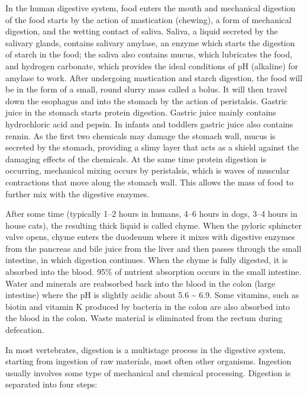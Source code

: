 In the human digestive system, food enters the mouth and mechanical digestion of the food starts by the action of mastication (chewing), a form of mechanical digestion, and the wetting contact of saliva. Saliva, a liquid secreted by the salivary glands, contains salivary amylase, an enzyme which starts the digestion of starch in the food; the saliva also contains mucus, which lubricates the food, and hydrogen carbonate, which provides the ideal conditions of pH (alkaline) for amylase to work. After undergoing mastication and starch digestion, the food will be in the form of a small, round slurry mass called a bolus. It will then travel down the esophagus and into the stomach by the action of peristalsis. Gastric juice in the stomach starts protein digestion. Gastric juice mainly contains hydrochloric acid and pepsin. In infants and toddlers gastric juice also contains rennin. As the first two chemicals may damage the stomach wall, mucus is secreted by the stomach, providing a slimy layer that acts as a shield against the damaging effects of the chemicals. At the same time protein digestion is occurring, mechanical mixing occurs by peristalsis, which is waves of muscular contractions that move along the stomach wall. This allows the mass of food to further mix with the digestive enzymes.

After some time (typically 1--2 hours in humans, 4--6 hours in dogs, 3--4 hours in house cats), the resulting thick liquid is called chyme. When the pyloric sphincter valve opens, chyme enters the duodenum where it mixes with digestive enzymes from the pancreas and bile juice from the liver and then passes through the small intestine, in which digestion continues. When the chyme is fully digested, it is absorbed into the blood. 95\% of nutrient absorption occurs in the small intestine. Water and minerals are reabsorbed back into the blood in the colon (large intestine) where the pH is slightly acidic about 5.6 \textasciitilde{} 6.9. Some vitamins, such as biotin and vitamin K produced by bacteria in the colon are also absorbed into the blood in the colon. Waste material is eliminated from the rectum during defecation.

In most vertebrates, digestion is a multistage process in the digestive system, starting from ingestion of raw materials, most often other organisms. Ingestion usually involves some type of mechanical and chemical processing. Digestion is separated into four steps:

